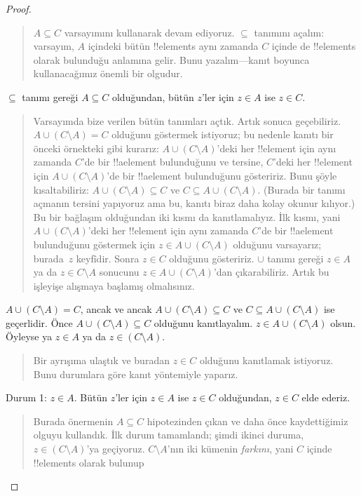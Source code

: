 \documentclass[../../../include/open-logic-section]{subfiles}
\begin{document}
\begin{proof}
\begin{quote}
    $A \subseteq C$ varsayımını kullanarak devam ediyoruz. $\subseteq$
    tanımını açalım: varsayım, $A$ içindeki bütün !!{element}s aynı zamanda
    $C$ içinde de !!{element}s olarak bulunduğu anlamına gelir. Bunu yazalım---kanıt
    boyunca kullanacağımız önemli bir olgudur.
  \end{quote}
  $\subseteq$ tanımı gereği $A \subseteq C$ olduğundan, bütün $z$'ler
  için $z \in A$ ise $z \in C$.
  \begin{quote}
    Varsayımda bize verilen bütün tanımları açtık. Artık sonuca
    geçebiliriz. $A \cup (C \setminus A) = C$ olduğunu göstermek
    istiyoruz; bu nedenle kanıtı bir önceki örnekteki gibi kurarız: $A
    \cup (C \setminus A)$'deki her !!{element} için aynı zamanda $C$'de
    bir !!a{element} bulunduğunu ve tersine, $C$'deki her !!{element} için
    $A \cup (C \setminus A)$'de bir !!a{element} bulunduğunu gösteririz.
    Bunu şöyle kısaltabiliriz: $A \cup (C \setminus A) \subseteq C$ ve
    $C \subseteq A \cup (C \setminus A)$. (Burada bir tanımı açmanın
    tersini yapıyoruz ama bu, kanıtı biraz daha kolay okunur kılıyor.)
    Bu bir bağlaşım olduğundan iki kısmı da kanıtlamalıyız. İlk kısmı,
    yani $A \cup (C \setminus A)$'deki her !!{element} için aynı zamanda
    $C$'de bir !!a{element} bulunduğunu göstermek için $z \in A \cup (C
    \setminus A)$ olduğunu varsayarız; burada~$z$ keyfîdir. Sonra $z \in C$ olduğunu
    gösteririz. $\cup$ tanımı gereği $z \in A$ ya da $z \in C \setminus A$
    sonucunu $z \in A \cup (C \setminus A)$'dan çıkarabiliriz. Artık
    bu işleyişe alışmaya başlamış olmalısınız.
    \end{quote}
  $A \cup (C \setminus A) = C$, ancak ve ancak $A \cup (C \setminus A)
  \subseteq C$ ve $C \subseteq A \cup (C \setminus A)$ ise geçerlidir.
  Önce $A \cup (C \setminus A) \subseteq C$ olduğunu kanıtlayalım. $z
  \in A \cup (C \setminus A)$ olsun. Öyleyse ya $z \in A$ ya da $z \in
  (C \setminus A)$.
  \begin{quote}
    Bir ayrışıma ulaştık ve buradan $z \in C$ olduğunu kanıtlamak
    istiyoruz. Bunu durumlara göre kanıt yöntemiyle yaparız.
  \end{quote}
  Durum 1: $z \in A$. Bütün $z$'ler için $z \in A$ ise $z \in C$
  olduğundan, $z \in C$ elde ederiz.
  \begin{quote}
    Burada önermenin $A \subseteq C$ hipotezinden çıkan ve daha önce
    kaydettiğimiz olguyu kullandık. İlk durum tamamlandı; şimdi ikinci
    duruma, $z \in (C \setminus A)$'ya geçiyoruz. $C \setminus A$'nın
    iki kümenin \emph{farkını}, yani $C$ içinde !!{element}s olarak bulunup

\end{quote}
\end{proof}
\end{document}
